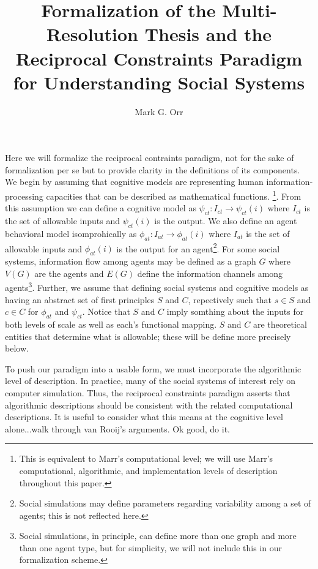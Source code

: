 \documentclass{article}
\title{Formalization of the Multi-Resolution Thesis and the Reciprocal Constraints Paradigm for Understanding Social Systems}
\author{Mark G. Orr}
\begin{document}
\maketitle
Here we will formalize the reciprocal contraints paradigm, not for the sake of formalization per se but to provide clarity in the definitions of its components.  We begin by assuming that cognitive models are representing human information-processing capacities that can be described as mathematical functions. \cite{van Rooij, 2008}\footnote{This is equivalent to Marr's computational level; we will use Marr's computational, algorithmic, and implementation levels of description\cite{Marr,1981} throughout this paper.}. From this assumption we can define a cognitive model as $\psi_{ct}: I_{ct} \rightarrow \psi_{ct}(i)$ where $I_{ct}$ is the set of allowable inputs and $\psi_{ct}(i)$ is the output.  We also define an agent behavioral model isomprohically as $\phi_{at}: I_{at} \rightarrow \phi_{at}(i)$ where $I_{at}$ is the set of allowable inputs and $\phi_{at}(i)$ is the output for an agent\footnote{Social simulations may define parameters regarding variability among a set of agents; this is not reflected here.}.  For some social systems, information flow among agents may be defined as a graph $G$ where $V(G)$ are the agents and $E(G)$ define the information channels among agents\footnote{Social simulations, in principle, can define more than one graph and more than one agent type, but for simplicity, we will not include this in our formalization scheme.}. Further, we assume that defining social systems and cognitive models as having an abstract set of first principles $S$ and $C$, repectively such that $s \in S$ and $c \in C$ for $\phi_{at}$ and $\psi_{ct}$. Notice that $S$ and $C$ imply somthing about the inputs for both levels of scale as well as each's functional mapping.  $S$ and $C$ are theoretical entities that determine what is allowable; these will be define more precisely below.  

To push our paradigm into a usable form, we must incorporate the algorithmic level of description\cite{Marr}.  In practice, many of the social systems of interest rely on computer simulation.  Thus, the reciprocal constraints paradigm asserts that algorithmic descriptions should be consistent with the related computational descriptions.  It is useful to consider what this means at the cognitive level alone...walk through van Rooij's arguments. Ok good, do it.
 

  
\end{document}

